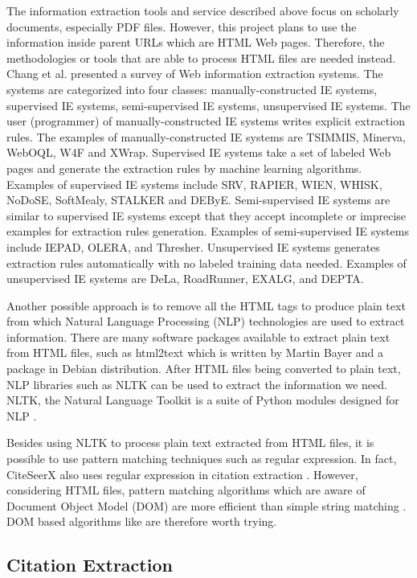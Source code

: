 \documentclass[prodmode]{acmsmall} %
\begin{document}
The information extraction tools and service described above focus on scholarly documents, especially PDF files. However, this project plans to use the information inside parent URLs which are HTML Web pages. Therefore, the methodologies or tools that are able to process HTML files are needed instead. Chang et al. presented a survey of Web information extraction systems. The systems are categorized into four classes: manually-constructed IE systems, supervised IE systems, semi-supervised IE systems, unsupervised IE systems. The user (programmer) of manually-constructed IE systems writes explicit extraction rules. The examples of manually-constructed IE systems are TSIMMIS, Minerva, WebOQL, W4F and XWrap. Supervised IE systems take a set of labeled Web pages and generate the extraction rules by machine learning algorithms. Examples of supervised IE systems include SRV, RAPIER, WIEN, WHISK, NoDoSE, SoftMealy, STALKER and DEByE. Semi-supervised IE systems are similar to supervised IE systems except that they accept incomplete or imprecise examples for extraction rules generation. Examples of semi-supervised IE systems include IEPAD, OLERA, and Thresher. Unsupervised IE systems generates extraction rules automatically with no labeled training data needed. Examples of unsupervised IE systems are DeLa, RoadRunner, EXALG, and DEPTA. \cite{chang2006survey}

Another possible approach is to remove all the HTML tags to produce plain text from which Natural Language Processing (NLP) technologies are used to extract information. There are many software packages available to extract plain text from HTML files, such as html2text which is written by Martin Bayer and a package in Debian distribution. After HTML files being converted to plain text, NLP libraries such as NLTK can be used to extract the information we need. NLTK, the Natural Language Toolkit is a suite of Python modules designed for NLP \cite{loper2002nltk}.

Besides using NLTK to process plain text extracted from HTML files, it is possible to use pattern matching techniques such as regular expression. In fact, CiteSeerX also uses regular expression in citation extraction \cite{wu2014citeseerx}. However, considering HTML files, pattern matching algorithms which are aware of Document Object Model (DOM) are more efficient than simple string matching \cite{kim2007web}. DOM based algorithms like \cite{gupta2003dom} are therefore worth trying.


\subsection{Citation Extraction}
\end{document}
